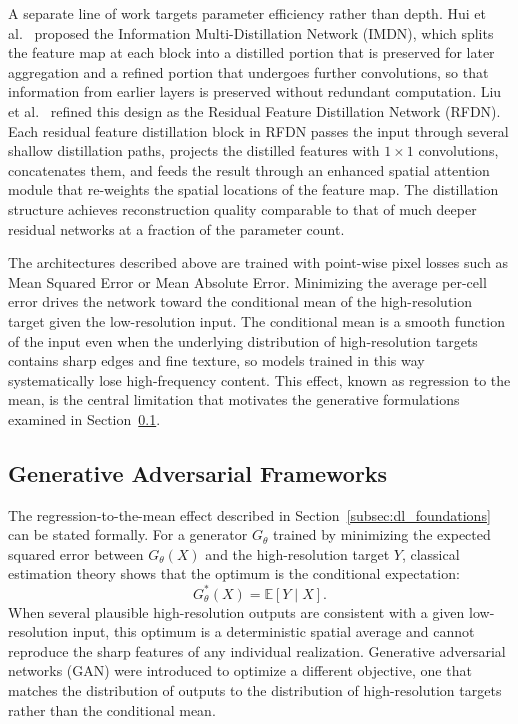 A separate line of work targets parameter efficiency rather than depth. Hui et al.~\cite{hui2019imdn} proposed the Information Multi-Distillation Network (IMDN), which splits the feature map at each block into a distilled portion that is preserved for later aggregation and a refined portion that undergoes further convolutions, so that information from earlier layers is preserved without redundant computation. Liu et al.~\cite{liu2020rfdn} refined this design as the Residual Feature Distillation Network (RFDN). Each residual feature distillation block in RFDN passes the input through several shallow distillation paths, projects the distilled features with $1 \times 1$ convolutions, concatenates them, and feeds the result through an enhanced spatial attention module that re-weights the spatial locations of the feature map. The distillation structure achieves reconstruction quality comparable to that of much deeper residual networks at a fraction of the parameter count.

The architectures described above are trained with point-wise pixel losses such as Mean Squared Error or Mean Absolute Error. Minimizing the average per-cell error drives the network toward the conditional mean of the high-resolution target given the low-resolution input. The conditional mean is a smooth function of the input even when the underlying distribution of high-resolution targets contains sharp edges and fine texture, so models trained in this way systematically lose high-frequency content. This effect, known as regression to the mean, is the central limitation that motivates the generative formulations examined in Section~\ref{subsec:gan_revolution}.

\subsection{Generative Adversarial Frameworks}
\label{subsec:gan_revolution}

The regression-to-the-mean effect described in Section~\ref{subsec:dl_foundations} can be stated formally. For a generator $G_\theta$ trained by minimizing the expected squared error between $G_\theta(X)$ and the high-resolution target $Y$, classical estimation theory shows that the optimum is the conditional expectation:
\begin{equation}
    G_\theta^*(X) = \mathbb{E}[Y \mid X].
\end{equation}
When several plausible high-resolution outputs are consistent with a given low-resolution input, this optimum is a deterministic spatial average and cannot reproduce the sharp features of any individual realization. Generative adversarial networks (GAN) were introduced to optimize a different objective, one that matches the distribution of outputs to the distribution of high-resolution targets rather than the conditional mean.

